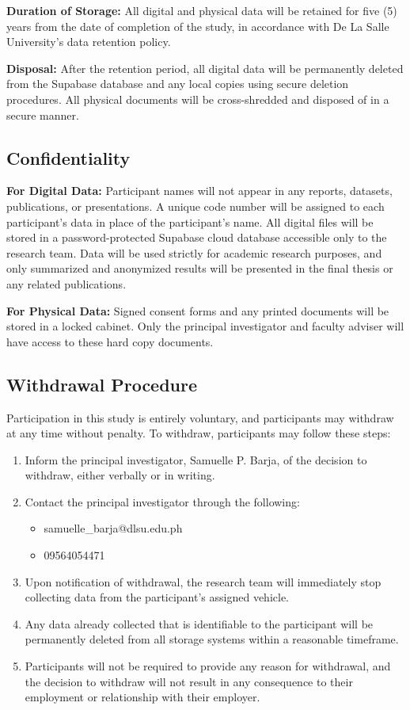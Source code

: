 \textbf{Duration of Storage:} All digital and physical data will be retained for five (5) years from the date of completion of the study, in accordance with De La Salle University's data retention policy.

\textbf{Disposal:} After the retention period, all digital data will be permanently deleted from the Supabase database and any local copies using secure deletion procedures. All physical documents will be cross-shredded and disposed of in a secure manner.

\subsection{Confidentiality}

\textbf{For Digital Data:} Participant names will not appear in any reports, datasets, publications, or presentations. A unique code number will be assigned to each participant's data in place of the participant's name. All digital files will be stored in a password-protected Supabase cloud database accessible only to the research team. Data will be used strictly for academic research purposes, and only summarized and anonymized results will be presented in the final thesis or any related publications.

\textbf{For Physical Data:} Signed consent forms and any printed documents will be stored in a locked cabinet. Only the principal investigator and faculty adviser will have access to these hard copy documents.

\subsection{Withdrawal Procedure}

Participation in this study is entirely voluntary, and participants may withdraw at any time without penalty. To withdraw, participants may follow these steps:

\begin{enumerate}[label=\textbf{(\alph*)}, leftmargin=*]
    \item Inform the principal investigator, Samuelle P. Barja, of the decision to withdraw, either verbally or in writing.
    \item Contact the principal investigator through the following:
    \begin{itemize}
        \item samuelle\_barja@dlsu.edu.ph
        \item 09564054471
    \end{itemize}
    \item Upon notification of withdrawal, the research team will immediately stop collecting data from the participant's assigned vehicle.
    \item Any data already collected that is identifiable to the participant will be permanently deleted from all storage systems within a reasonable timeframe.
    \item Participants will not be required to provide any reason for withdrawal, and the decision to withdraw will not result in any consequence to their employment or relationship with their employer.
\end{enumerate}

